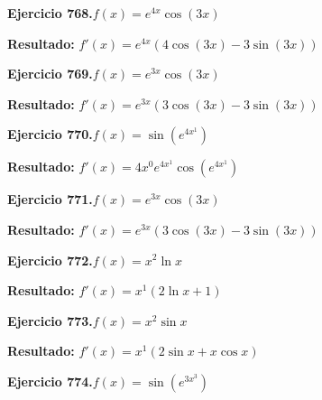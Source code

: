 \documentclass[10pt,a4paper]{article}
\begin{document}
\begin{ejbox}
\textbf{Ejercicio 768.}\quad $f(x) = e^{4x} \cos(3x)$
\end{ejbox}

\begin{solbox}
\textbf{Resultado:} \(\displaystyle f'(x) = e^{4x}(4\cos(3x) - 3\sin(3x))\)
\end{solbox}

\newpage
\begin{ejbox}
\textbf{Ejercicio 769.}\quad $f(x) = e^{3x} \cos(3x)$
\end{ejbox}

\begin{solbox}
\textbf{Resultado:} \(\displaystyle f'(x) = e^{3x}(3\cos(3x) - 3\sin(3x))\)
\end{solbox}

\begin{ejbox}
\textbf{Ejercicio 770.}\quad $f(x) = \sin(e^{4x^{1}})$
\end{ejbox}

\begin{solbox}
\textbf{Resultado:} \(\displaystyle f'(x) = 4x^{0}e^{4x^{1}}\cos(e^{4x^{1}})\)
\end{solbox}

\begin{ejbox}
\textbf{Ejercicio 771.}\quad $f(x) = e^{3x} \cos(3x)$
\end{ejbox}

\begin{solbox}
\textbf{Resultado:} \(\displaystyle f'(x) = e^{3x}(3\cos(3x) - 3\sin(3x))\)
\end{solbox}

\newpage
\begin{ejbox}
\textbf{Ejercicio 772.}\quad $f(x) = x^{2} \ln x$
\end{ejbox}

\begin{solbox}
\textbf{Resultado:} \(\displaystyle f'(x) = x^{1}(2\ln x + 1)\)
\end{solbox}

\begin{ejbox}
\textbf{Ejercicio 773.}\quad $f(x) = x^{2} \sin x$
\end{ejbox}

\begin{solbox}
\textbf{Resultado:} \(\displaystyle f'(x) = x^{1}(2\sin x + x\cos x)\)
\end{solbox}

\begin{ejbox}
\textbf{Ejercicio 774.}\quad $f(x) = \sin(e^{3x^{3}})$
\end{ejbox}
\end{document}
